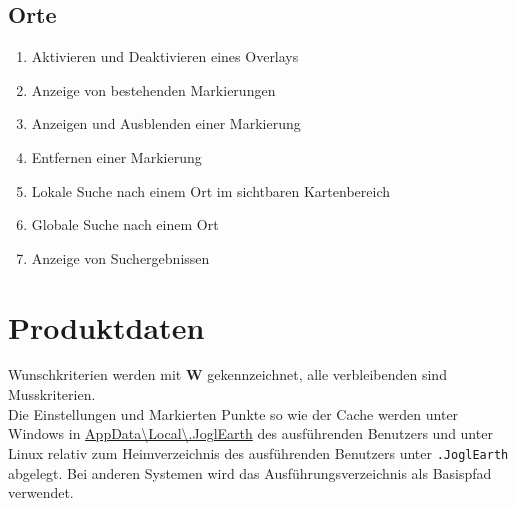 \documentclass[10pt]{scrreprt}
\newcommand{\sfbf}[1]{\textbf{\sffamily #1}}
\newcommand{\W}{\sfbf{W}}
\newcommand{\ziel}[1]{{\fontsize{9.5}{11}\textsf{/#1/}}}
\newcommand{\ziellabel}{Z}
\newcommand{\muss}{\renewcommand{\labelenumi}{\textbf{\ziel{\ziellabel\numprint{\theenumi}0}}}}
\newcommand{\wunsch}{\renewcommand{\labelenumi}{\textbf{\ziel{\ziellabel\numprint{\theenumi}0W}}}}
\begin{document}
\section{Orte}
\begin{enumerate}[leftmargin=2.2cm,resume]
\item Aktivieren und Deaktivieren eines Overlays
\wunsch
\item Anzeige von bestehenden Markierungen
\item Anzeigen und Ausblenden einer Markierung
\item Entfernen einer Markierung
\item Lokale Suche nach einem Ort im sichtbaren Kartenbereich
\item Globale Suche nach einem Ort
\item Anzeige von Suchergebnissen
\end{enumerate}


\chapter{Produktdaten}

\renewcommand{\ziellabel}{D}
\muss

Wunschkriterien werden mit {\W } gekennzeichnet, alle verbleibenden sind Musskriterien.\\

Die Einstellungen und Markierten Punkte so wie der Cache werden unter Windows in \url{AppData\Local\.JoglEarth} des ausführenden Benutzers und unter Linux relativ zum Heimverzeichnis des ausführenden Benutzers unter \texttt{.JoglEarth} abgelegt. Bei anderen Systemen wird das Ausführungsverzeichnis als Basispfad verwendet.
\vspace{5mm}
\end{document}
